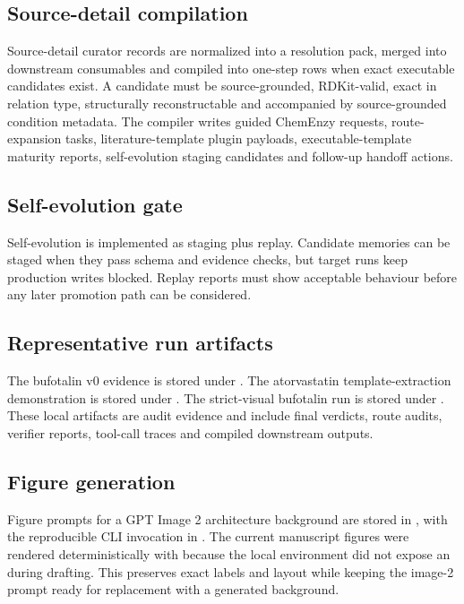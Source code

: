 \documentclass[11pt]{article}
\begin{document}
\subsection*{Source-detail compilation}

Source-detail curator records are normalized into a resolution pack, merged into downstream consumables and compiled into one-step rows when exact executable candidates exist. A candidate must be source-grounded, RDKit-valid, exact in relation type, structurally reconstructable and accompanied by source-grounded condition metadata. The compiler writes guided ChemEnzy requests, route-expansion tasks, literature-template plugin payloads, executable-template maturity reports, self-evolution staging candidates and follow-up handoff actions.

\subsection*{Self-evolution gate}

Self-evolution is implemented as staging plus replay. Candidate memories can be staged when they pass schema and evidence checks, but target runs keep production writes blocked. Replay reports must show acceptable behaviour before any later promotion path can be considered.

\subsection*{Representative run artifacts}

The bufotalin v0 evidence is stored under . The atorvastatin template-extraction demonstration is stored under . The strict-visual bufotalin run is stored under . These local artifacts are audit evidence and include final verdicts, route audits, verifier reports, tool-call traces and compiled downstream outputs.

\subsection*{Figure generation}

Figure prompts for a GPT Image 2 architecture background are stored in , with the reproducible CLI invocation in . The current manuscript figures were rendered deterministically with  because the local environment did not expose an  during drafting. This preserves exact labels and layout while keeping the image-2 prompt ready for replacement with a generated background.
\end{document}
